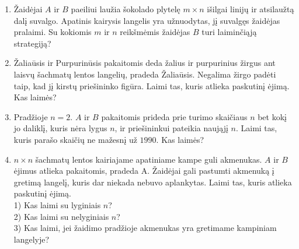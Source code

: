 \begin{enumerate}

\item Žaidėjai $A$ ir $B$ paeiliui laužia šokolado plytelę  $m\times n$ išilgai
  linijų ir atsilaužtą dalį suvalgo. Apatinis kairysis langelis yra
  užnuodytas, jį suvalgęs žaidėjas pralaimi. Su kokiomis $m$ ir $n$ reikšmėmis
  žaidėjas $B$ turi laiminčiąją strategiją? 


\item Žaliaūsis ir Purpurinūsis pakaitomis deda žalius ir purpurinius žirgus ant laisvų šachmatų lentos langelių, pradeda Žaliaūsis. Negalima žirgo padėti taip, kad jį kirstų priešininko figūra. Laimi tas, kuris atlieka paskutinį ėjimą. Kas laimės?


\item Pradžioje $n=2$. $A$ ir $B$ pakaitomis prideda prie turimo skaičiaus $n$ bet kokį jo daliklį, kuris nėra lygus $n$, ir priešininkui pateikia naująjį $n$. Laimi tas, kuris parašo skaičių ne mažesnį už $1990$. Kas laimės?


\item  $n\times n$ šachmatų lentos kairiajame apatiniame kampe guli akmenukas. $A$ ir $B$ ėjimus atlieka pakaitomis, pradeda A. Žaidėjai gali pastumti akmenuką į gretimą langelį, kuris dar niekada nebuvo aplankytas. Laimi tas, kuris atlieka paskutinį ėjimą.\\
  1) Kas laimi su lyginiais $n$? \\
  2) Kas laimi su nelyginiais $n$? \\
  3) Kas laimi, jei žaidimo pradžioje akmenukas yra gretimame kampiniam langelyje?


\end{enumerate}
